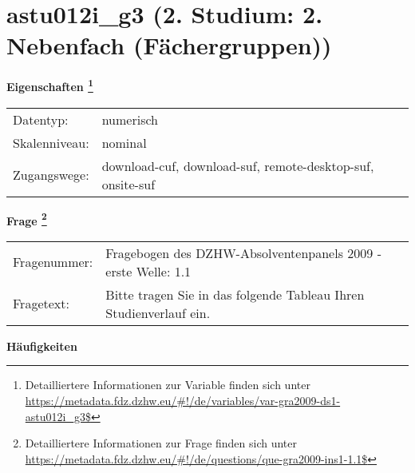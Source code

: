 
    \setcounter{footnote}{0}

    \vspace*{-1.8cm}
	\section{astu012i\_g3 (2. Studium: 2. Nebenfach (Fächergruppen))}
	\label{section:astu012i_g3}



    \vspace*{0.5cm}
    \noindent\textbf{Eigenschaften
	\footnote{Detailliertere Informationen zur Variable finden sich unter
		\url{https://metadata.fdz.dzhw.eu/\#!/de/variables/var-gra2009-ds1-astu012i_g3$}}}\\
	\begin{tabularx}{\hsize}{@{}lX}
	Datentyp: & numerisch \\
	Skalenniveau: & nominal \\
	Zugangswege: &
	  download-cuf, 
	  download-suf, 
	  remote-desktop-suf, 
	  onsite-suf
 \\
    \end{tabularx}



				\vspace*{0.5cm}
                \noindent\textbf{Frage
	                \footnote{Detailliertere Informationen zur Frage finden sich unter
		              \url{https://metadata.fdz.dzhw.eu/\#!/de/questions/que-gra2009-ins1-1.1$}}}\\
				\begin{tabularx}{\hsize}{@{}lX}
					Fragenummer: &
					  Fragebogen des DZHW-Absolventenpanels 2009 - erste Welle:
					  1.1
 \\
					Fragetext: & Bitte tragen Sie in das folgende Tableau Ihren Studienverlauf ein. \\
				\end{tabularx}





        		\vspace*{0.5cm}
                \noindent\textbf{Häufigkeiten}

